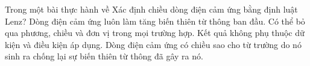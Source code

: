 \begin{ex}
Trong một bài thực hành về Xác định chiều dòng điện cảm ứng bằng định luật Lenz?
\choice
{Dòng điện cảm ứng luôn làm tăng biến thiên từ thông ban đầu.}
{Có thể bỏ qua phương, chiều và đơn vị trong mọi trường hợp.}
{Kết quả không phụ thuộc dữ kiện và điều kiện áp dụng.}
{\True Dòng điện cảm ứng có chiều sao cho từ trường do nó sinh ra chống lại sự biến thiên từ thông đã gây ra nó.}
\end{ex}
